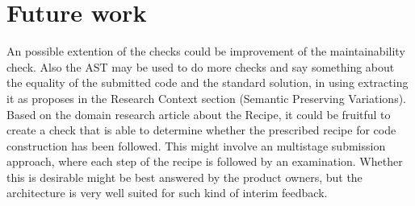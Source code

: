 \section{Future work}
An possible extention of the \glspl{check} could be improvement of the
maintainability check.
Also the AST may be used to do more \glspl{check} and say something about the
equality of the submitted code and the standard solution, in using extracting it
as proposes in the Research Context section (Semantic Preserving Variations). 
Based on the domain research article about the Recipe, it could be fruitful to 
create a \gls{check} 
that is able to determine whether the prescribed recipe for code construction 
has been followed. This might involve an multistage submission approach, where 
each step of the recipe is followed by an examination. Whether this is desirable
might be best answered by the product owners, but the architecture is very well
suited for such kind of interim feedback.

